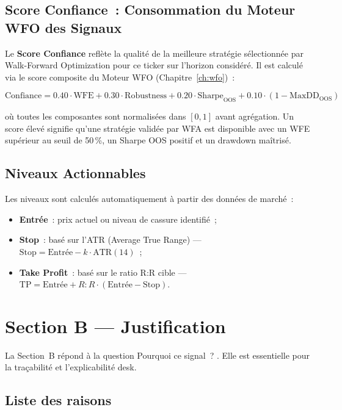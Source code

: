 \subsection{Score Confiance~: Consommation du Moteur WFO des Signaux}

Le \textbf{Score Confiance} reflète la qualité de la meilleure stratégie sélectionnée
par Walk-Forward Optimization pour ce ticker sur l'horizon considéré. Il est calculé
via le score composite du Moteur WFO (Chapitre~\ref{ch:wfo})~:

\begin{equation}
\text{Confiance} = 0.40 \cdot \text{WFE} + 0.30 \cdot \text{Robustness}
                 + 0.20 \cdot \text{Sharpe}_{\text{OOS}} + 0.10 \cdot (1 - \text{MaxDD}_{\text{OOS}})
\label{eq:confidence_score}
\end{equation}

où toutes les composantes sont normalisées dans $[0, 1]$ avant agrégation.
Un score élevé signifie qu'une stratégie validée par WFA est disponible
avec un WFE supérieur au seuil de 50\,\%, un Sharpe OOS positif et un
drawdown maîtrisé.

\subsection{Niveaux Actionnables}

Les niveaux sont calculés automatiquement à partir des données de marché~:
\begin{itemize}
    \item \textbf{Entrée}~: prix actuel ou niveau de cassure identifié~;
    \item \textbf{Stop}~: basé sur l'ATR (Average True Range) — $\text{Stop} = \text{Entrée} - k \cdot \text{ATR}(14)$~;
    \item \textbf{Take Profit}~: basé sur le ratio R:R cible — $\text{TP} = \text{Entrée} + R:R \cdot (\text{Entrée} - \text{Stop})$.
\end{itemize}

\section{Section B --- Justification}
\label{sec:justification}

La Section~B répond à la question \og Pourquoi ce signal~? \fg{}. Elle est essentielle
pour la traçabilité et l'explicabilité desk.

\subsection{Liste des raisons}

